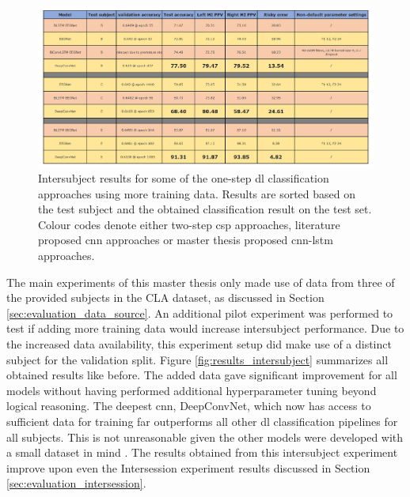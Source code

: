 \begin{figure}[ht]
    \centering
    \includegraphics[width=\linewidth]{../images/results/more_data.pdf}
    \captionsetup{width=\linewidth}
    \captionsetup{justification=centering}
    \caption{Intersubject results for some of the one-step \gls{dl} classification approaches using more training data. Results are sorted based on the test subject and the obtained classification result on the test set. Colour codes denote either two-step \gls{csp} approaches, literature proposed \gls{cnn} approaches or master thesis proposed \gls{cnn}-\gls{lstm} approaches.} 
    \label{fig:results_more_data}
\end{figure}

The main experiments of this master thesis only made use of data from three of the provided subjects in the CLA dataset, as discussed in Section \ref{sec:evaluation_data_source}.
An additional pilot experiment was performed to test if adding more training data would increase intersubject performance.
Due to the increased data availability, this experiment setup did make use of a distinct subject for the validation split.
Figure \ref{fig:results_intersubject} summarizes all obtained results like before.
The added data gave significant improvement for all models without having performed additional hyperparameter tuning beyond logical reasoning.
The deepest \gls{cnn}, DeepConvNet, which now has access to sufficient data for training far outperforms all other \gls{dl} classification pipelines for all subjects.
This is not unreasonable given the other models were developed with a small dataset in mind \citep{eeg_model_eegnet}.
The results obtained from this intersubject experiment improve upon even the Intersession experiment results discussed in Section \ref{sec:evaluation_intersession}.

